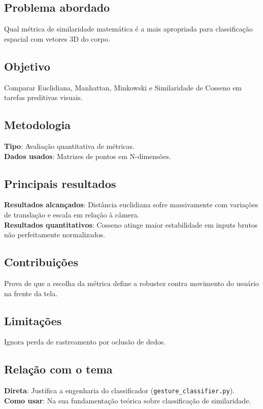\documentclass[12pt, a4paper]{article}
\begin{document}
\subsection{Problema abordado}
Qual métrica de similaridade matemática é a mais apropriada para classificação espacial com vetores 3D do corpo.\\
\subsection{Objetivo}
Comparar Euclidiana, Manhattan, Minkowski e Similaridade de Cosseno em tarefas preditivas visuais.\\
\subsection{Metodologia}
\textbf{Tipo}: Avaliação quantitativa de métricas.\\
\textbf{Dados usados}: Matrizes de pontos em N-dimensões.\\
\subsection{Principais resultados}
\textbf{Resultados alcançados}: Distância euclidiana sofre massivamente com variações de translação e escala em relação à câmera.\\
\textbf{Resultados quantitativos}: Cosseno atinge maior estabilidade em inputs brutos não perfeitamente normalizados.\\
\subsection{Contribuições}
Prova de que a escolha da métrica define a robustez contra movimento do usuário na frente da tela.\\
\subsection{Limitações}
Ignora perda de rastreamento por oclusão de dedos.\\
\subsection{Relação com o tema}
\textbf{Direta}: Justifica a engenharia do classificador (\texttt{gesture\_classifier.py}).\\
\textbf{Como usar}: Na sua fundamentação teórica sobre classificação de similaridade.\\
\end{document}
